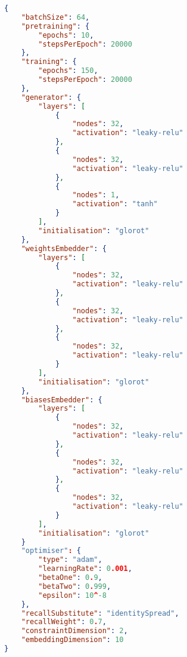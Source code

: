 \documentclass[../main.tex]{subfiles}
\begin{document}
\begin{lstlisting}[language=json,firstnumber=1,caption={Experimental parameters for training a generator to match an arbitrary constraint satisfaction function parameterised by a constraint vector.},captionpos=b]
{
    "batchSize": 64,
    "pretraining": {
        "epochs": 10,
        "stepsPerEpoch": 20000
    },
    "training": {
        "epochs": 150,
        "stepsPerEpoch": 20000
    },
    "generator": {
        "layers": [
            {
                "nodes": 32,
                "activation": "leaky-relu"
            },
            {
                "nodes": 32,
                "activation": "leaky-relu"
            },
            {
                "nodes": 1,
                "activation": "tanh"
            }
        ],
        "initialisation": "glorot"
    },
    "weightsEmbedder": {
        "layers": [
            {
                "nodes": 32,
                "activation": "leaky-relu"
            },
            {
                "nodes": 32,
                "activation": "leaky-relu"
            },
            {
                "nodes": 32,
                "activation": "leaky-relu"
            }
        ],
        "initialisation": "glorot"
    },
    "biasesEmbedder": {
        "layers": [
            {
                "nodes": 32,
                "activation": "leaky-relu"
            },
            {
                "nodes": 32,
                "activation": "leaky-relu"
            },
            {
                "nodes": 32,
                "activation": "leaky-relu"
            }
        ],
        "initialisation": "glorot"
    }
    "optimiser": {
        "type": "adam",
        "learningRate": 0.001,
        "betaOne": 0.9,
        "betaTwo": 0.999,
        "epsilon": 10^-8
    },
    "recallSubstitute": "identitySpread",
    "recallWeight": 0.7,
    "constraintDimension": 2,
    "embeddingDimension": 10
}
\end{lstlisting}
\end{document}
